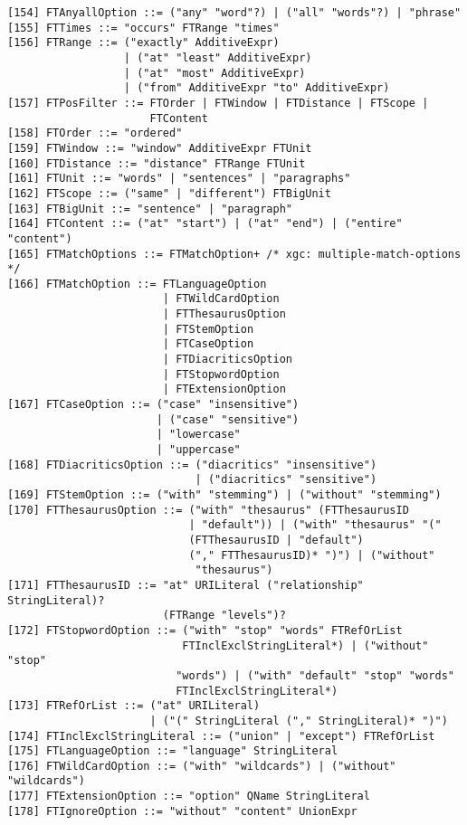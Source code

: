 \begin{verbatim}
[154] FTAnyallOption ::= ("any" "word"?) | ("all" "words"?) | "phrase"
[155] FTTimes ::= "occurs" FTRange "times"
[156] FTRange ::= ("exactly" AdditiveExpr)
                  | ("at" "least" AdditiveExpr)
                  | ("at" "most" AdditiveExpr)
                  | ("from" AdditiveExpr "to" AdditiveExpr)
[157] FTPosFilter ::= FTOrder | FTWindow | FTDistance | FTScope |
                      FTContent 
[158] FTOrder ::= "ordered"
[159] FTWindow ::= "window" AdditiveExpr FTUnit
[160] FTDistance ::= "distance" FTRange FTUnit
[161] FTUnit ::= "words" | "sentences" | "paragraphs"
[162] FTScope ::= ("same" | "different") FTBigUnit
[163] FTBigUnit ::= "sentence" | "paragraph"
[164] FTContent ::= ("at" "start") | ("at" "end") | ("entire" "content")
[165] FTMatchOptions ::= FTMatchOption+	/* xgc: multiple-match-options */
[166] FTMatchOption ::= FTLanguageOption
                        | FTWildCardOption
                        | FTThesaurusOption
                        | FTStemOption
                        | FTCaseOption
                        | FTDiacriticsOption
                        | FTStopwordOption
                        | FTExtensionOption
[167] FTCaseOption ::= ("case" "insensitive")
                       | ("case" "sensitive")
                       | "lowercase"
                       | "uppercase"
[168] FTDiacriticsOption ::= ("diacritics" "insensitive")
                             | ("diacritics" "sensitive")
[169] FTStemOption ::= ("with" "stemming") | ("without" "stemming")
[170] FTThesaurusOption ::= ("with" "thesaurus" (FTThesaurusID 
                            | "default")) | ("with" "thesaurus" "("
                            (FTThesaurusID | "default")
                            ("," FTThesaurusID)* ")") | ("without"
                             "thesaurus")
[171] FTThesaurusID ::= "at" URILiteral ("relationship" StringLiteral)?
                        (FTRange "levels")?
[172] FTStopwordOption ::= ("with" "stop" "words" FTRefOrList
                           FTInclExclStringLiteral*) | ("without" "stop"
                          "words") | ("with" "default" "stop" "words"  
                          FTInclExclStringLiteral*) 
[173] FTRefOrList ::= ("at" URILiteral)
                      | ("(" StringLiteral ("," StringLiteral)* ")")
[174] FTInclExclStringLiteral ::= ("union" | "except") FTRefOrList
[175] FTLanguageOption ::= "language" StringLiteral
[176] FTWildCardOption ::= ("with" "wildcards") | ("without" "wildcards")
[177] FTExtensionOption ::= "option" QName StringLiteral
[178] FTIgnoreOption ::= "without" "content" UnionExpr


\end{verbatim}
